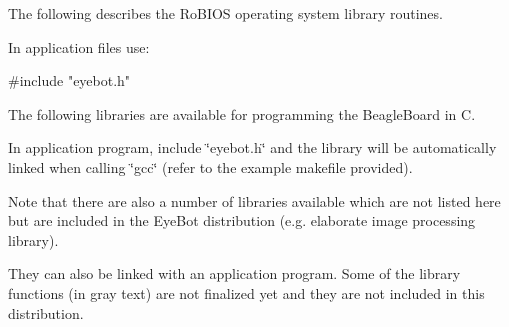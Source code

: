 \-The following describes the \-Ro\-B\-I\-O\-S operating system library routines.\par
 \-In application files use\-:\par
 
\begin{DoxyCode}
 #include "eyebot.h"
\end{DoxyCode}
 \-The following libraries are available for programming the \-Beagle\-Board in \-C.\par
 \-In application program, include \char`\"{}eyebot.\-h\char`\"{} and the library will be automatically linked when calling \char`\"{}gcc\char`\"{} (refer to the example makefile provided).\par
 \-Note that there are also a number of libraries available which are not listed here but are included in the \-Eye\-Bot distribution (e.\-g. elaborate image processing library).\par
 \-They can also be linked with an application program. \-Some of the library functions (in gray text) are not finalized yet and they are not included in this distribution. 